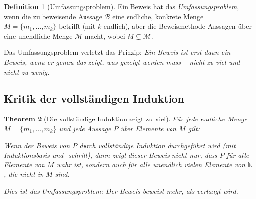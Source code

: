 \documentclass[12pt, a4paper]{article}
\newtheorem{theorem}{Theorem}[section]
\theoremstyle{definition}
\newtheorem{definition}[theorem]{Definition}
\theoremstyle{remark}
\newcommand{\N}{\mathbb{N}}
\begin{document}
\begin{definition}[Umfassungsproblem]
\label{def:umfassungsproblem}
Ein Beweis hat das \emph{Umfassungsproblem}, wenn die zu beweisende Aussage $\mathcal{B}$ eine endliche, konkrete Menge $M = \{m_1, \ldots, m_k\}$ betrifft (mit $k$ endlich), aber die Beweismethode Aussagen über eine unendliche Menge $\mathcal{M}$ macht, wobei $M \subsetneq \mathcal{M}$.

Das Umfassungsproblem verletzt das Prinzip: \emph{Ein Beweis ist erst dann ein Beweis, wenn er genau das zeigt, was gezeigt werden muss -- nicht zu viel und nicht zu wenig.}
\end{definition}

\subsection{Kritik der vollständigen Induktion}
\label{subsec:kritik_induktion}

\begin{theorem}[Die vollständige Induktion zeigt zu viel]
\label{thm:induktion_zu_viel}
Für jede endliche Menge $M = \{m_1, \ldots, m_k\}$ und jede Aussage $P$ über Elemente von $M$ gilt:

Wenn der Beweis von $P$ durch vollständige Induktion durchgeführt wird (mit Induktionsbasis und -schritt), dann zeigt dieser Beweis nicht nur, dass $P$ für alle Elemente von $M$ wahr ist, sondern auch für alle unendlich vielen Elemente von $\N$, die nicht in $M$ sind.

Dies ist das \emph{Umfassungsproblem}: Der Beweis beweist mehr, als verlangt wird.
\end{theorem}
\end{document}
